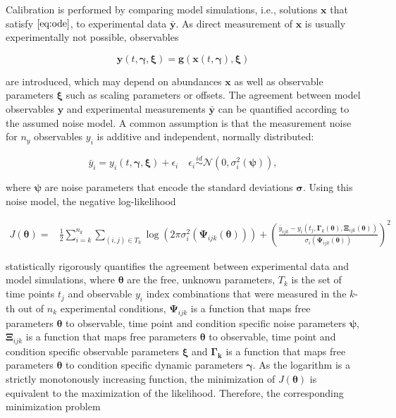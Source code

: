 \documentclass[11pt]{article}
\newcommand{\dims}[1]{{n_{#1}}}
\begin{document}
Calibration is performed by comparing model simulations, i.e., solutions
\(\textbf{x}\) that satisfy \(\eqref{eq:ode}\), to experimental data
\(\bar{\textbf{y}}\). As direct measurement of \(\textbf{x}\) is usually
experimentally not possible, observables

\begin{equation}
\textbf{y}(t,\boldsymbol{\gamma},\boldsymbol{\xi}) = \textbf{g}(\textbf{x}(t,\boldsymbol{\gamma}),\boldsymbol{\xi})
\label{eq:observable}
\end{equation}

are introduced, which may depend on abundances \(\textbf{x}\) as well as
observable parameters \(\boldsymbol{\xi}\) such as scaling parameters or
offsets. The agreement between model observables \(\textbf{y}\) and
experimental measurements \(\bar{\textbf{y}}\) can be quantified
according to the assumed noise model. A common assumption is that the
measurement noise for \(\dims{y}\) observables \(y_i\) is additive and
independent, normally distributed:

\begin{equation}
\bar{y}_{i} = y_i(t,\boldsymbol{\gamma},\boldsymbol{\xi}) + \epsilon_{i} \quad \epsilon_{i} \overset{id}{\sim} \mathcal{N}(0,\sigma_{i}^2(\boldsymbol{\psi})),
\label{eq:noise}
\end{equation}

where \(\boldsymbol{\psi}\) are noise parameters that encode the
standard deviations \(\boldsymbol{\sigma}\). Using this noise model, the
negative log-likelihood

\begin{equation}
\begin{aligned}
J(\boldsymbol{\theta}) =&  \frac{1}{2} \sum_{i=k}^\dims{k} \sum_{(i,j) \in T_k} \log\left(2\pi\sigma_{i}^2(\boldsymbol{\Psi}_{ijk}(\boldsymbol{\theta}))\right) + \left(\frac{\bar{y}_{ijk} - y_{i}(t_j,\boldsymbol{\Gamma}_k(\boldsymbol{\theta}),\boldsymbol{\Xi}_{ijk}(\boldsymbol{\theta}))}{\sigma_{i}(\boldsymbol{\Psi}_{ijk}(\boldsymbol{\theta}))}\right)^2
\label{eq:objective}
\end{aligned}
\end{equation}

statistically rigorously quantifies the agreement between experimental
data and model simulations, where \(\boldsymbol{\theta}\) are the free,
unknown parameters, \(T_k\) is the set of time points \(t_j\) and
observable \(y_i\) index combinations that were measured in the \(k\)-th
out of \(\dims{k}\) experimental conditions, \(\boldsymbol{\Psi}_{ijk}\)
is a function that maps free parameters \(\boldsymbol{\theta}\) to
observable, time point and condition specific noise parameters
\(\boldsymbol{\psi}\), \(\boldsymbol{\Xi}_{ijk}\) is a function that
maps free parameters \(\boldsymbol{\theta}\) to observable, time point
and condition specific observable parameters \(\boldsymbol{\xi}\) and
\(\boldsymbol{\Gamma_{k}}\) is a function that maps free parameters
\(\boldsymbol{\theta}\) to condition specific dynamic parameters
\(\boldsymbol{\gamma}\). As the logarithm is a strictly monotonously
increasing function, the minimization of \(J(\boldsymbol{\theta})\) is
equivalent to the maximization of the likelihood. Therefore, the
corresponding minimization problem
\end{document}
